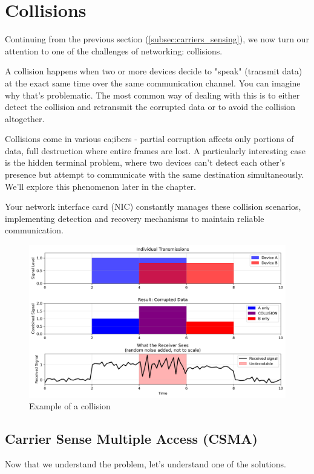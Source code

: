 \section{Collisions}\label{sec:collisions}
Continuing from the previous section (\ref{subsec:carriers_sensing}), we now turn our attention to one of the challenges of networking: collisions. 

A collision happens when two or more devices decide to "speak" (transmit data) at the exact same time over the same communication channel. You can imagine why that's problematic. The most common way of dealing with this is to either detect the collision and retransmit the corrupted data or to avoid the collision altogether.

Collisions come in various ca;ibers - partial corruption affects only portions of data, full destruction where entire frames are lost. A particularly interesting case is the hidden terminal problem, where two devices can't detect each other's presence but attempt to communicate with the same destination simultaneously. We'll explore this phenomenon later in the chapter.

Your network interface card (NIC) constantly manages these collision scenarios, implementing detection and recovery mechanisms to maintain reliable communication.
\vfill
\begin{figure}[h]
    \centering
    \includegraphics[width=\textwidth]{assets/diagrams/csma/collisions.png}
    \caption{Example of a collision}
    \label{fig:collision_visualization}
\end{figure}

\newpage
\subsection{Carrier Sense Multiple Access (CSMA)}
Now that we understand the problem, let's understand one of the solutions.

